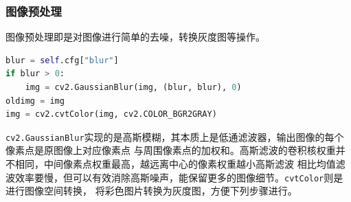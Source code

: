 \documentclass[UTF8,10pt,titlepage,a4paper]{ctexart}
\begin{document}
\subsubsection{图像预处理}
图像预处理即是对图像进行简单的去噪，转换灰度图等操作。
\begin{lstlisting}[language=python]
blur = self.cfg["blur"]
if blur > 0:
	img = cv2.GaussianBlur(img, (blur, blur), 0)
oldimg = img
img = cv2.cvtColor(img, cv2.COLOR_BGR2GRAY)
\end{lstlisting}
\verb|cv2.GaussianBlur|实现的是高斯模糊，其本质上是低通滤波器，输出图像的每个像素点是原图像上对应像素点
与周围像素点的加权和。高斯滤波的卷积核权重并不相同，中间像素点权重最高，越远离中心的像素权重越小高斯滤波
相比均值滤波效率要慢，但可以有效消除高斯噪声，能保留更多的图像细节。\verb|cvtColor|则是进行图像空间转换，
将彩色图片转换为灰度图，方便下列步骤进行。
\end{document}
